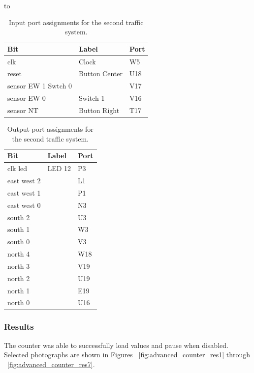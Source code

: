 to\documentclass[11pt]{article}
\begin{document}
\begin{table}[H]
\begin{center}
\begin{tabular}{| l | l | l |}
	\hline
	Bit & Label & Port \\ \hline
	clk &  Clock & W5 \\ \hline
	reset & Button Center & U18 \\ \hline
	sensor EW 1 Swtch 0 & & V17 \\ \hline
	sensor EW 0 & Switch 1 & V16 \\ \hline
	sensor NT & Button Right& T17 \\ \hline
\end{tabular}
\caption{\label{tab:part2_input_Ports}Input port assignments for  the second traffic system.}
\end{center}
\end{table}

\begin{table}[H]
\begin{center}
\begin{tabular}{| l | l | l |}
	\hline
	Bit & Label & Port \\ \hline
	clk led & LED 12 & P3 \\ \hline
	east west 2 & & L1 \\ \hline
	east west 1 & & P1 \\ \hline
	east west 0 & & N3 \\ \hline
	south 2 & & U3 \\ \hline
	south 1 & & W3 \\ \hline
	south 0 & & V3 \\ \hline
	north 4 & & W18 \\ \hline
	north 3 & & V19 \\ \hline
	north 2 & & U19 \\ \hline
	north 1 & & E19 \\ \hline
	north 0 & & U16 \\ \hline
\end{tabular}
\caption{\label{tab:part2_output_Ports}Output port assignments for the second traffic system.}
\end{center}
\end{table}


\subsubsection{Results}
The counter was able to successfully load values and pause when disabled. Selected photographs are shown in Figures ~\ref{fig:advanced_counter_res1} through ~\ref{fig:advanced_counter_res7}.
\end{document}

